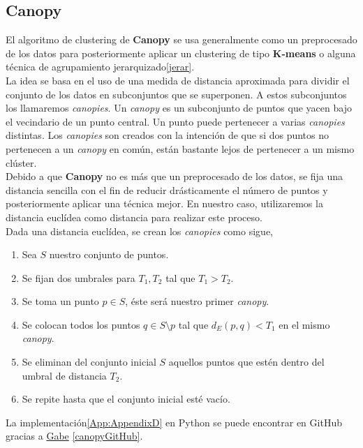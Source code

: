 \documentclass[a4paper, 12pt]{article}
\begin{document}
\pagebreak
\subsection{Canopy}\label{sec:canopy}

El algoritmo de clustering de \textbf{Canopy} se usa generalmente como un preprocesado de los datos para posteriormente aplicar un clustering de tipo \textbf{K-means} o alguna t\'ecnica de agrupamiento jerarquizado\ref{jerar}.\\

La idea se basa en el uso de una medida de distancia aproximada para dividir el conjunto de los datos en subconjuntos que se superponen. A estos subconjuntos los llamaremos \textit{canopies}. Un \textit{canopy} es un subconjunto de puntos que yacen bajo el vecindario de un punto central. Un punto puede pertenecer a varias \textit{canopies} distintas. Los \textit{canopies} son creados con la intenci\'on de que si dos puntos no pertenecen a un \textit{canopy} en com\'un, est\'an bastante lejos de pertenecer a un mismo cl\'uster. \\

Debido a que \textbf{Canopy} no es m\'as que un preprocesado de los datos, se fija una distancia sencilla con el fin de reducir dr\'asticamente el n\'umero de puntos y posteriormente aplicar una t\'ecnica mejor. En nuestro caso, utilizaremos la distancia eucl\'idea como distancia para realizar este proceso. \\

Dada una distancia eucl\'idea, se crean los \textit{canopies} como sigue,

\begin{enumerate}
	\item Sea $S$ nuestro conjunto de puntos.
	\item Se fijan dos umbrales para $T_1, T_2$ tal que $T_1 > T_2$. 
	\item Se toma un punto $p\in S$, \'este ser\'a nuestro primer \textit{canopy}.
	\item Se colocan todos los puntos $q\in S\setminus{p}$ tal que $d_E(p, q) < T_1$ en el mismo \textit{canopy}. 
	\item Se eliminan del conjunto inicial $S$ aquellos puntos que est\'en dentro del umbral de distancia $T_2$.
	\item Se repite hasta que el conjunto inicial est\'e vac\'io.
\end{enumerate}

La implementaci\'on\ref{App:AppendixD} en Python se puede encontrar en GitHub gracias a \href{https://github.com/gdbassett}{Gabe} \ref{canopyGitHub}.
\end{document}

